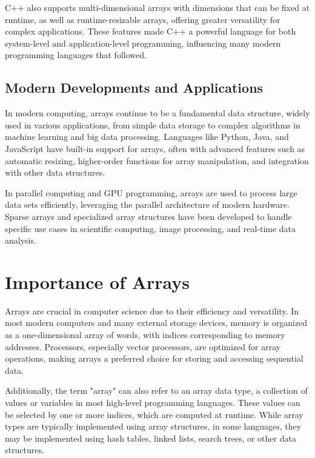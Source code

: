 \documentclass{book}
\begin{document}
	C++ also supports multi-dimensional arrays with dimensions that can be fixed at runtime, as well as runtime-resizable arrays, offering greater versatility for complex applications. These features made C++ a powerful language for both system-level and application-level programming, influencing many modern programming languages that followed.
	
	\subsection{Modern Developments and Applications}
	
	In modern computing, arrays continue to be a fundamental data structure, widely used in various applications, from simple data storage to complex algorithms in machine learning and big data processing. Languages like Python, Java, and JavaScript have built-in support for arrays, often with advanced features such as automatic resizing, higher-order functions for array manipulation, and integration with other data structures.
	
	In parallel computing and GPU programming, arrays are used to process large data sets efficiently, leveraging the parallel architecture of modern hardware. Sparse arrays and specialized array structures have been developed to handle specific use cases in scientific computing, image processing, and real-time data analysis.
	
	\section{Importance of Arrays}
	
	Arrays are crucial in computer science due to their efficiency and versatility. In most modern computers and many external storage devices, memory is organized as a one-dimensional array of words, with indices corresponding to memory addresses. Processors, especially vector processors, are optimized for array operations, making arrays a preferred choice for storing and accessing sequential data.
	
	Additionally, the term "array" can also refer to an array data type, a collection of values or variables in most high-level programming languages. These values can be selected by one or more indices, which are computed at runtime. While array types are typically implemented using array structures, in some languages, they may be implemented using hash tables, linked lists, search trees, or other data structures.
	
\end{document}
